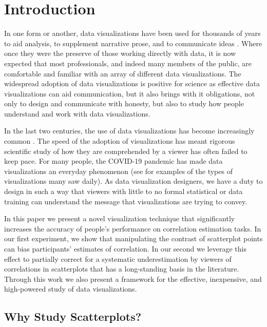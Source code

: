 \documentclass[preprint, 3p,
authoryear]{elsarticle} %
\begin{document}
\hypertarget{introduction}{%
\section{Introduction}\label{introduction}}

In one form or another, data visualizations have been used for thousands
of years to aid analysis, to supplement narrative prose, and to
communicate ideas \citep{azzam_2013}. Where once they were the preserve
of those working directly with data, it is now expected that most
professionals, and indeed many members of the public, are comfortable
and familiar with an array of different data visualizations. The
widespread adoption of data visualizations is positive for science as
effective data visualizations can aid communication, but it also brings
with it obligations, not only to design and communicate with honesty,
but also to study how people understand and work with data
visualizations.

In the last two centuries, the use of data visualizations has become
increasingly common \citep{friendly_2005, azzam_2013}. The speed of the
adoption of visualizations has meant rigorous scientific study of how
they are comprehended by a viewer has often failed to keep pace. For
many people, the COVID-19 pandemic has made data visualizations an
everyday phenomenon (see \citet{bbc_2022} for examples of the types of
visualizations many saw daily). As data visualization designers, we have
a duty to design in such a way that viewers with little to no formal
statistical or data training can understand the message that
visualizations are trying to convey.

In this paper we present a novel visualization technique that
significantly increases the accuracy of people's performance on
correlation estimation tasks. In our first experiment, we show that
manipulating the contrast of scatterplot points can bias participants'
estimates of correlation. In our second we leverage this effect to
partially correct for a systematic underestimation by viewers of
correlations in scatterplots that has a long-standing basis in the
literature. Through this work we also present a framework for the
effective, inexpensive, and high-powered study of data visualizations.

\hypertarget{why-study-scatterplots}{%
\subsection{Why Study Scatterplots?}\label{why-study-scatterplots}}
\end{document}
